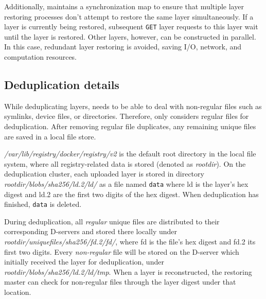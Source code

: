 Additionally, \sysname maintains a synchronization map to ensure that multiple layer
restoring processes don't attempt to restore the same layer simultaneously.
%
If a layer is currently being restored, subsequent
\texttt{GET} layer requests to this layer wait until the layer is restored.
%
Other layers, however, can be constructed in parallel.
%
In this case, redundant layer restoring is avoided, saving I/O, network, and
computation resources.
 
 
\subsection{Deduplication details}
\label{sec:deduplication-details}

%
While deduplicating layers, \sysname needs to be able to deal with
non-regular files such as symlinks, device files, or directories.
%
%
Therefore, \sysname only considers regular files for deduplication.
%
After removing regular file duplicates, any remaining unique files are saved in a local file store.
%

\emph{/var/lib/registry/docker/registry/v2} is the default root directory in the local file system, 
where all
registry-related data is stored (denoted as \emph{rootdir}).
%
On the deduplication cluster,
each uploaded layer is stored in directory \emph{rootdir/blobs/sha256/ld.2/ld/}
as a file named \texttt{data} where ld is the layer's hex
digest and ld.2 are the first two digits of the hex digest.
%
When deduplication has finished, \texttt{data} is deleted.

During deduplication, all \emph{regular} unique files are distributed to their
corresponding D-servers and stored there locally under
\emph{rootdir/uniquefiles/sha256/fd.2/fd/}, where fd is the file's hex
digest and fd.2 its first two digits.
%
Every \emph{non-regular} file will be stored on the D-server which initially
received the layer for deduplication, under \emph{rootdir/blobs/sha256/ld.2/ld/tmp}.
%
When a layer is reconstructed, the restoring master can check for non-regular files through
the layer digest under that location.
%

